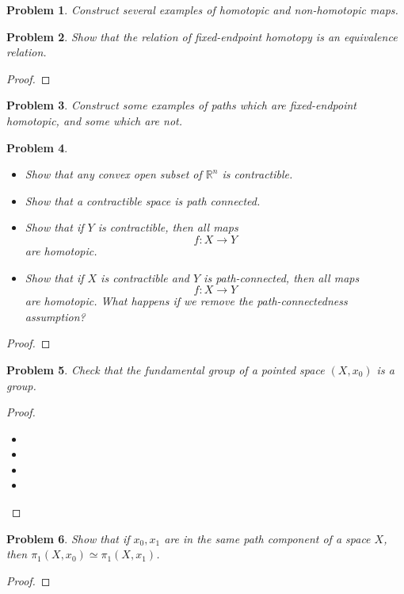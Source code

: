 \documentclass[10pt]{article}
\newcommand{\sk}{\vskip 10mm}
\newcommand{\bb}[1]{\mathbb{#1}}
\theoremstyle{plain}
\newtheorem{problem}{Problem}
\theoremstyle{remark}
\begin{document}
\begin{problem} %
  Construct several examples of homotopic and non-homotopic maps.
\end{problem}

\sk

\begin{problem} %
  Show that the relation of fixed-endpoint homotopy is an equivalence relation.
\end{problem}

\begin{proof}
  
\end{proof}

\sk

\begin{problem} %
  Construct some examples of paths which are fixed-endpoint homotopic, and some
  which are not.
\end{problem}

\sk

\begin{problem} %
  \begin{itemize}
  \item[a)] Show that any convex open subset of $\bb{R}^n$ is contractible.
  \item[b)] Show that a contractible space is path connected.
  \item[c)] Show that if $Y$ is contractible, then all maps
    \[ f:X\rightarrow Y\]
    are homotopic.
  \item[d)] Show that if $X$ is contractible and $Y$ is path-connected, then all
    maps
    \[ f:X\rightarrow Y\] are homotopic. What happens if we remove the path-connectedness
    assumption?
  \end{itemize}
\end{problem}

\begin{proof}
  
\end{proof}

\sk

\begin{problem} %
  Check that the fundamental group of a pointed space $(X,x_0)$ is a group.
\end{problem}

\begin{proof}
  \begin{itemize}
  \item[a)] 
  \item[b)] 
  \item[c)] 
  \item[d)] 
  \end{itemize}  
\end{proof}

\sk

\begin{problem} %
  Show that if $x_0,x_1$ are in the same path component of a space $X$, then
  $\pi_1(X,x_0)\simeq\pi_1(X,x_1)$.
\end{problem}

\begin{proof}
  
\end{proof}

\sk
\end{document}
